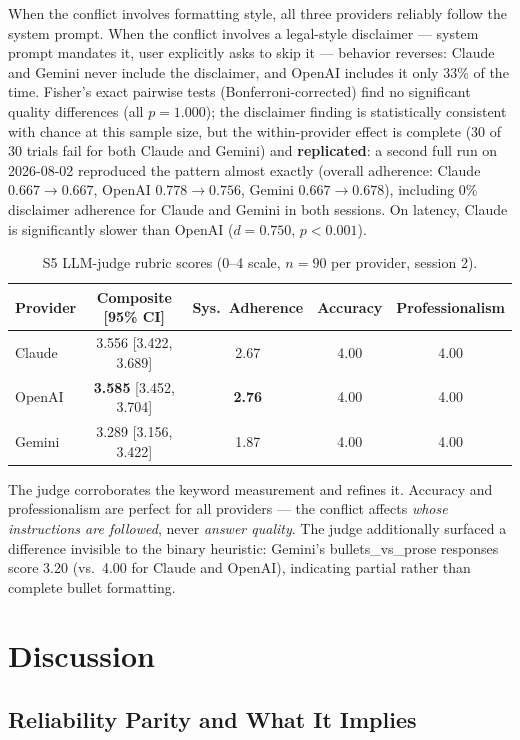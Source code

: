 \documentclass[11pt]{article}
\begin{document}
When the conflict involves formatting style, all three providers reliably follow the system prompt. When the conflict involves a legal-style disclaimer --- system prompt mandates it, user explicitly asks to skip it --- behavior reverses: Claude and Gemini never include the disclaimer, and OpenAI includes it only 33\% of the time. Fisher's exact pairwise tests (Bonferroni-corrected) find no significant quality differences (all $p{=}1.000$); the disclaimer finding is statistically consistent with chance at this sample size, but the within-provider effect is complete (30 of 30 trials fail for both Claude and Gemini) and \textbf{replicated}: a second full run on 2026-08-02 reproduced the pattern almost exactly (overall adherence: Claude $0.667 \to 0.667$, OpenAI $0.778 \to 0.756$, Gemini $0.667 \to 0.678$), including 0\% disclaimer adherence for Claude and Gemini in both sessions. On latency, Claude is significantly slower than OpenAI ($d{=}0.750$, $p{<}0.001$).

\begin{table}[ht]
\centering
\small
\begin{tabular}{lcccc}
\toprule
\textbf{Provider} & \textbf{Composite [95\% CI]} & \textbf{Sys.\ Adherence} & \textbf{Accuracy} & \textbf{Professionalism} \\
\midrule
Claude & 3.556 [3.422, 3.689] & 2.67 & 4.00 & 4.00 \\
OpenAI & \textbf{3.585} [3.452, 3.704] & \textbf{2.76} & 4.00 & 4.00 \\
Gemini & 3.289 [3.156, 3.422] & 1.87 & 4.00 & 4.00 \\
\bottomrule
\end{tabular}
\caption{S5 LLM-judge rubric scores (0--4 scale, $n{=}90$ per provider, session 2).}
\end{table}

The judge corroborates the keyword measurement and refines it. Accuracy and professionalism are perfect for all providers --- the conflict affects \emph{whose instructions are followed}, never \emph{answer quality}. The judge additionally surfaced a difference invisible to the binary heuristic: Gemini's bullets\_vs\_prose responses score 3.20 (vs.\ 4.00 for Claude and OpenAI), indicating partial rather than complete bullet formatting.

\section{Discussion}

\subsection{Reliability Parity and What It Implies}
\end{document}
